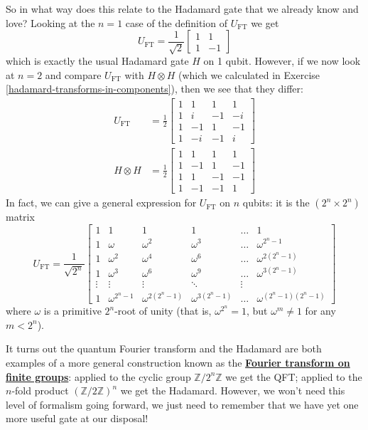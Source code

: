 \documentclass[fleqn,a4paper]{article}
\theoremstyle{definition}
\theoremstyle{definition}
\theoremstyle{definition}
\theoremstyle{definition}
\theoremstyle{remark}
\begin{document}
So in what way does this relate to the Hadamard gate that we already know and love?
Looking at the \(n=1\) case of the definition of \(U_{\mathrm{FT}}\) we get
\[
  U_{\mathrm{FT}}
  = \frac{1}{\sqrt{2}}
  \begin{bmatrix}
    1 & 1
  \\1 & -1
  \end{bmatrix}
\]
which is exactly the usual Hadamard gate \(H\) on 1 qubit.
However, if we now look at \(n=2\) and compare \(U_{\mathrm{FT}}\) with \(H\otimes H\) (which we calculated in Exercise \ref{hadamard-transforms-in-components}), then we see that they differ:
\[
  \begin{aligned}
    U_{\mathrm{FT}}
    &= \frac{1}{2}
    \begin{bmatrix}
      1 & 1 & 1 & 1
    \\1 & i & -1 & -i
    \\1 & -1 & 1 & -1
    \\1 & -i & -1 & i
    \end{bmatrix}
  \\H\otimes H
    &= \frac{1}{2}
    \begin{bmatrix}
      1 & 1 & 1 & 1
    \\1 & -1 & 1 & -1
    \\1 & 1 & -1 & -1
    \\1 & -1 & -1 & 1
    \end{bmatrix}
  \end{aligned}
\]
In fact, we can give a general expression for \(U_{\mathrm{FT}}\) on \(n\) qubits: it is the \((2^n\times 2^n)\) matrix
\[
  U_{\mathrm{FT}}
  = \frac{1}{\sqrt{2^n}}
  \begin{bmatrix}
    1 & 1 & 1 & 1 & \ldots & 1
  \\1 & \omega & \omega^2 & \omega^3 & \ldots & \omega^{2^n-1}
  \\1 & \omega^2 & \omega^4 & \omega^6 & \ldots & \omega^{2(2^n-1)}
  \\1 & \omega^3 & \omega^6 & \omega^9 & \ldots & \omega^{3(2^n-1)}
  \\\vdots & \vdots & \vdots & \ddots & \vdots
  \\1 & \omega^{2^n-1} & \omega^{2(2^n-1)} & \omega^{3(2^n-1)} & \ldots & \omega^{(2^n-1)(2^n-1)}
  \end{bmatrix}
\]
where \(\omega\) is a primitive \(2^n\)-root of unity (that is, \(\omega^{2^n}=1\), but \(\omega^m\neq1\) for any \(m<2^n\)).

It turns out the quantum Fourier transform and the Hadamard are both examples of a more general construction known as the \href{https://en.wikipedia.org/wiki/Fourier_transform_on_finite_groups}{\textbf{Fourier transform on finite groups}}: applied to the cyclic group \(\mathbb{Z}/2^n\mathbb{Z}\) we get the QFT; applied to the \(n\)-fold product \((\mathbb{Z}/2\mathbb{Z})^n\) we get the Hadamard.
However, we won't need this level of formalism going forward, we just need to remember that we have yet one more useful gate at our disposal!
\end{document}
